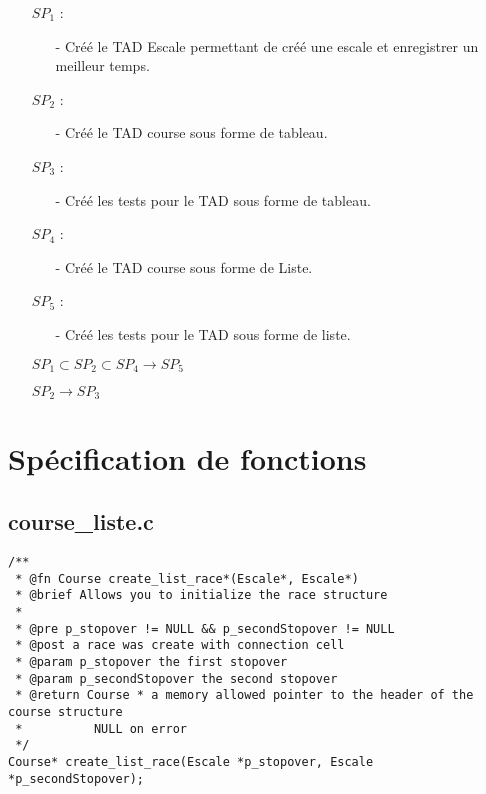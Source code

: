 \documentclass[a4paper, 11pt, oneside]{article}
\begin{document}
	\begin{itemize}
		\item[] $SP_1$ :
		\begin{itemize}
			\item[-] Créé le TAD Escale permettant de créé une escale et enregistrer un meilleur temps.
		\end{itemize}
		\item[] $SP_2$ :
		\begin{itemize}
			\item[-] Créé le TAD course sous forme de tableau.
		\end{itemize}
		\item[] $SP_3$ :
		\begin{itemize}
			\item[-] Créé les tests pour le TAD sous forme de tableau.
		\end{itemize}
		\item[] $SP_4$ :
		\begin{itemize}
			\item[-] Créé le TAD course sous forme de Liste.
		\end{itemize}
		\item[] $SP_5$ :
		\begin{itemize}
			\item[-] Créé les tests pour le TAD sous forme de liste.
		\end{itemize}
	\end{itemize}
	
	\vspace{5mm}
	
	\begin{itemize}
		\item[] $SP_1 \subset SP_2 \subset SP_4 \rightarrow SP_5$
		\item[] $SP_2 \rightarrow SP_3$
	\end{itemize}
	
\newpage

\section{Spécification de fonctions}

	\subsection{course\_liste.c}
	
		\begin{lstlisting}
/**
 * @fn Course create_list_race*(Escale*, Escale*)
 * @brief Allows you to initialize the race structure
 *
 * @pre p_stopover != NULL && p_secondStopover != NULL
 * @post a race was create with connection cell
 * @param p_stopover the first stopover
 * @param p_secondStopover the second stopover
 * @return Course * a memory allowed pointer to the header of the course structure
 * 			NULL on error
 */
Course* create_list_race(Escale *p_stopover, Escale *p_secondStopover);
		\end{lstlisting}
\end{document}
